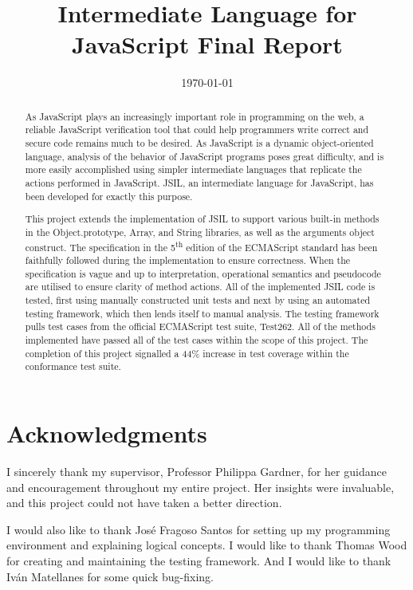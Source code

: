 \documentclass[a4paper,11pt,twoside]{report}
\title{Intermediate Language for JavaScript Final Report}
\date{\today}
\begin{document}


\clearpage{\pagestyle{empty}\cleardoublepage}
\setcounter{page}{1}
\pagestyle{fancy}

\begin{abstract}
As JavaScript plays an increasingly important role in programming on the web, a reliable JavaScript verification tool that could help programmers write correct and secure code remains much to be desired. As JavaScript is a dynamic object-oriented language, analysis of the behavior of JavaScript programs poses great difficulty, and is more easily accomplished using simpler intermediate languages that replicate the actions performed in JavaScript. JSIL, an intermediate language for JavaScript, has been developed for exactly this purpose.

\smallskip
This project extends the implementation of JSIL to support various built-in methods in the Object.prototype, Array, and String libraries, as well as the arguments object construct. The specification in the 5\textsuperscript{th} edition of the ECMAScript standard has been faithfully followed during the implementation to ensure correctness. When the specification is vague and up to interpretation, operational semantics and pseudocode are utilised to ensure clarity of method actions. All of the implemented JSIL code is tested, first using manually constructed unit tests and next by using an automated testing framework, which then lends itself to manual analysis. The testing framework pulls test cases from the official ECMAScript test suite, Test262. All of the methods implemented have passed all of the test cases within the scope of this project. The completion of this project signalled a 44\% increase in test coverage within the conformance test suite.
\end{abstract}

\cleardoublepage
\section*{Acknowledgments}
I sincerely thank my supervisor, Professor Philippa Gardner, for her guidance and encouragement throughout my entire project. Her insights were invaluable, and this project could not have taken a better direction.

\smallskip
I would also like to thank Jos\'e Fragoso Santos for setting up my programming environment and explaining logical concepts. I would like to thank Thomas Wood for creating and maintaining the testing framework. And I would like to thank Iv\'an Matellanes for some quick bug-fixing.
\end{document}
